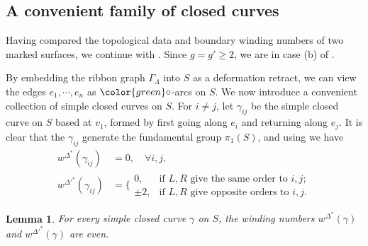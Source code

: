 \documentclass[11pt,reqno]{amsart}
\theoremstyle{plain}
\newtheorem{lemma}[theorem]{Lemma}
\theoremstyle{definition}
\theoremstyle{remark}
\numberwithin{equation}{section}
\begin{document}
\subsection{A convenient family of closed curves}\label{subsec:a familt of closed curves}
\par Having compared the topological data and boundary winding numbers of two marked surfaces, we continue with \cite[Theorem 7.4(3)]{APS}. Since $g=g'\geq2$, we are in case (b) of \cite[loc. cit.]{APS}.
\par By embedding the ribbon graph $\Gamma_\Lambda$ into $S$ as a deformation retract, we can view the edges $e_1,\cdots,e_n$ as $\color{green}\circ$-arcs on $S$. We now introduce a convenient collection of simple closed curves on $S$. For $i\ne j$, let $\gamma_{ij}$ be the simple closed curve on $S$ based at $v_1$, formed by first going along $e_i$ and returning along $e_j$. It is clear that the $\gamma_{ij}$ generate the fundamental group $\pi_1(S)$, and using \cite[Lemma 3.18]{APS} we have
\begin{equation}\label{eq:winding number}
    \begin{aligned}
        w^{\Delta^*}(\gamma_{ij})&=0,\quad\forall i,j,\\
        w^{\Delta'^*}(\gamma_{ij})&=\Bigg\{\!\!
        \begin{array}{ll}
            0, & \text{if $L,R$ give the same order to $i,j$}; \\
            \pm2, & \text{if $L,R$ give opposite orders to $i,j$}.
        \end{array}
    \end{aligned}
\end{equation}
\begin{lemma}
    For every simple closed curve $\gamma$ on $S$, the winding numbers $w^{\Delta^*}(\gamma)$ and $w^{\Delta'^*}(\gamma)$ are even.
\end{lemma}
\end{document}
